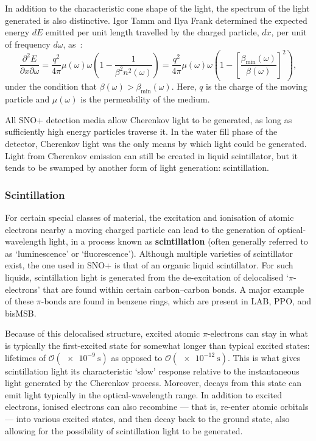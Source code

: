 In addition to the characteristic cone shape of the light, the spectrum of the light generated is also distinctive. Igor Tamm and Ilya Frank determined the expected energy $dE$ emitted per unit length travelled by the charged particle, $dx$, per unit of frequency $d\omega$, as~\cite{}: %
\begin{equation}
    \frac{\partial^{2}E}{\partial x\partial\omega} = 
    \frac{q^2}{4\pi}\mu(\omega)\omega\left(1-\frac{1}{\beta^{2}n^{2}(\omega)}\right) = 
    \frac{q^2}{4\pi}\mu(\omega)\omega\left(1-\left[\frac{\beta_{\textrm{min}}(\omega)}{\beta(\omega)}\right]^{2}\right),
\end{equation}
under the condition that $\beta(\omega) > \beta_{\mathrm{min}}(\omega)$. Here, $q$ is the charge of the moving particle and $\mu(\omega)$ is the permeability of the medium.

All SNO+ detection media allow Cherenkov light to be generated, as long as sufficiently high energy particles traverse it. In the water fill phase of the detector, Cherenkov light was the only means by which light could be generated. Light from Cherenkov emission can still be created in liquid scintillator, but it tends to be swamped by another form of light generation: scintillation.
\subsubsection{Scintillation}\label{sec:scintillation}
For certain special classes of material, the excitation and ionisation of atomic electrons nearby a moving charged particle can lead to the generation of optical-wavelength light, in a process known as \textbf{scintillation} (often generally referred to as `luminescence' or `fluorescence'). Although multiple varieties of scintillator exist, the one used in SNO+ is that of an organic liquid scintillator. For such liquids, scintillation light is generated from the de-excitation of delocalised `$\pi$-electrons' that are found within certain carbon--carbon bonds. A major example of these $\pi$-bonds are found in benzene rings, which are present in LAB, PPO, and bisMSB.

Because of this delocalised structure, excited atomic $\pi$-electrons can stay in what is typically the first-excited state for somewhat longer than typical excited states: lifetimes of $\mathcal{O}(\SI{e-9}{\second})$ as opposed to $\mathcal{O}(\SI{e-12}{\second})$. This is what gives scintillation light its characteristic `slow' response relative to the instantaneous light generated by the Cherenkov process. Moreover, decays from this state can emit light typically in the optical-wavelength range. In addition to excited electrons, ionised electrons can also recombine --- that is, re-enter atomic orbitals --- into various excited states, and then decay back to the ground state, also allowing for the possibility of scintillation light to be generated.

